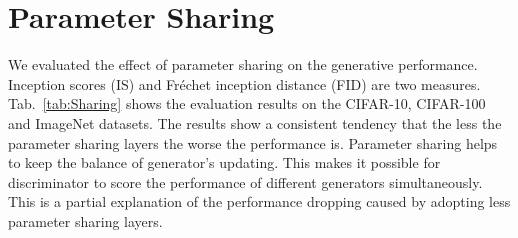 \documentclass{article}
\begin{document}
\begin{table}
\small
\centering\caption{Network architecture and hyperparameters of LDAGAN on the ImageNet dataset.}
\label{tab2}
\end{table}

\section{Parameter Sharing}
\label{App:ParShare}
We evaluated the effect of parameter sharing on the generative performance.
Inception scores (IS) and Fr\'{e}chet inception distance (FID) are two measures.
Tab.~\ref{tab:Sharing} shows the evaluation results on the CIFAR-10, CIFAR-100 and ImageNet datasets.
The results show a consistent tendency that the less the parameter sharing layers the worse the performance is.
Parameter sharing helps to keep the balance of generator's updating.
This makes it possible for discriminator to score the performance of different generators simultaneously.
This is a partial explanation of the performance dropping caused by adopting less parameter sharing layers.
\end{document}
